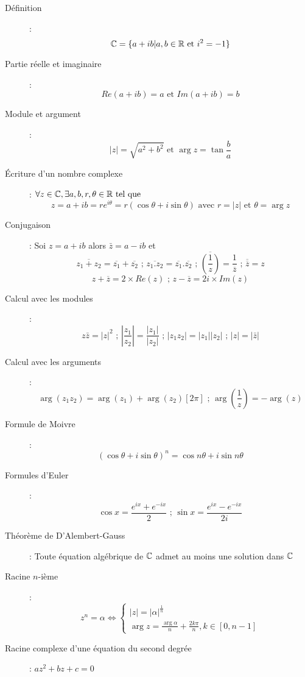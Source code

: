\begin{description}
\item[Définition] : 
    \[ \mathbb{C}=\{a+ib | a,b\in\mathbb{R}\textrm{ et } i^2=-1 \} \]
\item[Partie réelle et imaginaire] :
    \[ Re(a+ib)=a\textrm{ et }Im(a+ib)=b \]
\item[Module et argument] : 
    \[
        |z|=\sqrt{a^2+b^2}
        \textrm{ et }
        \arg z = \tan\frac{b}{a}
    \]
\item[Écriture d'un nombre complexe] :
    $\forall z\in\mathbb{C}, \exists a,b,r,\theta\in\mathbb{R}\textrm{ tel que }$
    \[
        z=a+ib
        =re^{i\theta}
        =r(\cos\theta+i\sin\theta)
        \textrm{ avec }
        r=|z|
        \textrm{ et }
        \theta = \arg z
    \]
\item[Conjugaison] : Soi $z=a+ib$ alors $\bar z=a-ib$ et 
    \[
        \overline{z_1+z_2}=\overline{z_1}+\overline{z_2}
        \textrm{ ; }
        \overline{z_1.z_2}=\overline{z_1}.\overline{z_2}
        \textrm{ ; }
        \overline{\left(\frac{1}{z}\right)}=\frac{1}{\overline z}
        \textrm{ ; }
        \overline{\overline{z}}=z
    \]
    \[
        z+\overline{z}=2\times Re(z)
        \textrm{ ; }
        z-\overline{z}=2i\times Im(z)
    \]
\item[Calcul avec les modules] :
    \[
        z\bar z=|z|^2
        \textrm{ ; }
        \left|\frac{z_1}{z_2}\right|=\frac{|z_1|}{|z_2|}
        \textrm{ ; }
        |z_1z_2|=|z_1||z_2|
        \textrm{ ; }
        |z|=|\bar z|
    \]
\item[Calcul avec les arguments] :
    \[
        \arg(z_1z_2)=\arg(z_1)+\arg(z_2)[2\pi]
        \textrm{ ; }
        \arg\left(\frac{1}{z}\right)=-\arg(z)
    \]
\item[Formule de Moivre] : 
    \[ (\cos\theta+i\sin\theta)^n=\cos n\theta+i\sin n\theta \]
\item[Formules d'Euler] : 
    \[
        \cos x=\frac{e^{ix}+e^{-ix}}{2}
        \textrm{ ; }
        \sin x=\frac{e^{ix}-e^{-ix}}{2i}
    \]
\item[Théorème de D’Alembert-Gauss] : Toute équation algébrique de $\mathbb{C}$ admet au moins une solution dans $\mathbb{C}$
\item[Racine $n$-ième] :
    \[
        z^n=\alpha\Leftrightarrow
        \begin{cases}
            |z|=|\alpha|^{\frac{1}{n}}\\
            \arg z=\frac{\arg\alpha}{n}+\frac{2k\pi}{n}, k\in[0,n-1]
        \end{cases}
    \]
\item[Racine complexe d'une équation du second degrée] : $az^2+bz+c=0$

\end{description}
